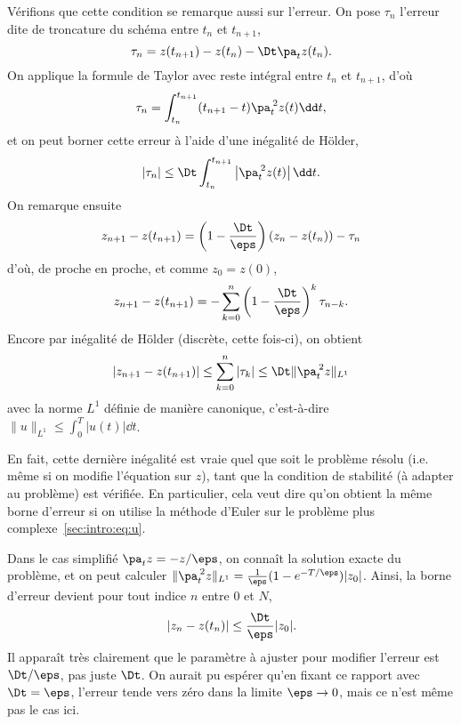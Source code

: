 Vérifions que cette condition se remarque aussi sur l'erreur. On pose
$\tau_n$ l'erreur dite de troncature du schéma entre $t_n$ et $t_{n+1}$,
\begin{equation*}
    \tau_n = z(t_{n+1}) - z(t_n) - \Dt \pa_t z(t_{n}) .
\end{equation*}
On applique la formule de Taylor avec reste intégral entre $t_n$ et
$t_{n+1}$, d'où 
\begin{equation*}
    \tau_n = \int_{t_n}^{t_{n+1}} (t_{n+1} - t) 
        \pa_t^{\:2}z(t) \dd t ,
\end{equation*}
et on peut borner cette erreur à l'aide d'une inégalité de Hölder,
\begin{equation*}
    |\tau_n| \leq \Dt 
        \int_{t_n}^{t_{n+1}} \left| \pa_t^{\:2} z(t) \right| \dd t .
\end{equation*}
On remarque ensuite 
\begin{equation*}
    z_{n+1} - z(t_{n+1}) 
    = \left(1 - \frac{\Dt}{\eps}\right)(z_n - z(t_n))
        - \tau_n
\end{equation*}
d'où, de proche en proche, et comme $z_0 = z(0)$,
\begin{equation*}
    z_{n+1} - z(t_{n+1}) 
    = -\sum_{k = 0}^n \left(1 - \frac{\Dt}{\eps}\right)^k \tau_{n-k} .
\end{equation*}
Encore par inégalité de Hölder (discrète, cette fois-ci), on obtient
\begin{equation*}
    \left| z_{n+1} - z(t_{n+1}) \right|
    \leq \sum_{k = 0}^n |\tau_k| \leq \Dt \| \pa_t^{\:2}z \|_{L^1}
\end{equation*}
avec la norme $L^1$ définie de manière canonique, c'est-à-dire $ \| u
\|_{L^1} \leq \int_0^T | u(t) | \dd t $. 

En fait, cette dernière
inégalité est vraie quel que soit le problème résolu (i.e. même si on
modifie l'équation sur $z$), tant que la condition de stabilité (à
adapter au problème) est vérifiée. En particulier, cela veut dire qu'on
obtient la même borne d'erreur si on utilise la méthode d'Euler sur le
problème plus complexe~\eqref{sec:intro:eq:u}. 

Dans le cas simplifié $\pa_t z = -z/\eps$, on connaît la solution
exacte du problème, et on peut calculer $\| \pa_t^{\:2}z \|_{L^1} =
\frac{1}{\eps} (1 - e^{-T/\eps}) |z_0|$. Ainsi, la borne d'erreur
devient pour tout indice $n$ entre $0$ et $N$,
\begin{equation*}
    \left| z_n - z(t_n) \right| \leq \frac{\Dt}{\eps} |z_0| .
\end{equation*}
Il apparaît très clairement que le paramètre à ajuster pour modifier
l'erreur est $\Dt/\eps$, pas juste $\Dt$. On aurait pu espérer qu'en
fixant ce rapport avec $\Dt = \eps$, l'erreur tende vers zéro dans la
limite $\eps \rightarrow 0$, mais ce n'est même pas le cas ici. 

